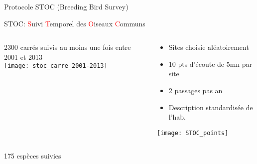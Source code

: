 \documentclass[]{beamer}
\begin{document}
\begin{frame}{Protocole STOC (Breeding Bird Survey)}
  \begin{center}
    STOC: \textcolor{red}{S}uivi \textcolor{red}{T}emporel des \textcolor{red}{O}iseaux \textcolor{red}{C}ommuns
  \end{center}
  \begin{columns}[c]
    \begin{column}[c]{0.5\textwidth}
      \begin{center}
        2300 carrés suivis au moins une fois entre 2001 et 2013 \\
        \texttt{[image: stoc\_carre\_2001-2013]}
      \end{center}
    \end{column}
    \begin{column}[c]{0.5\textwidth}
      \begin{small}
        \begin{itemize}
        \item  Sites choisie aléatoirement
        \item 10 pts d'écoute de 5mn par site
        \item 2 passages pas an
        \item Description standardisée de l'hab.
        \end{itemize}
      \end{small}
      \begin{center}
        \texttt{[image: STOC\_points]}
      \end{center}
    \end{column}
  \end{columns}
  \begin{center}
    175 espèces suivies
  \end{center}
\end{frame}
\end{document}
